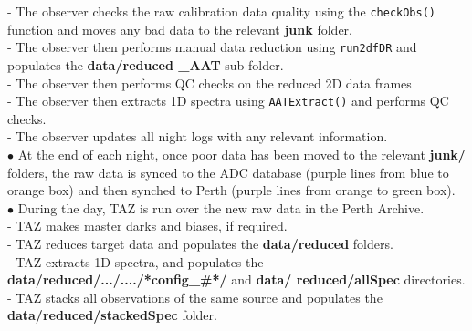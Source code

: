 \documentclass[12pt]{article}
\begin{document}
\hspace{10mm} - The observer checks the raw calibration data quality using the \texttt{checkObs()} function and moves any bad data to the relevant \textbf{junk} folder.\\

\hspace{10mm} - The observer then performs manual data reduction using \texttt{run2dfDR} and populates the \textbf{data/reduced \_AAT} sub-folder. \\

\hspace{10mm} - The observer then performs QC checks on the reduced 2D data frames\\

\hspace{10mm} - The observer then extracts 1D spectra using  \texttt{AATExtract()} and performs QC checks.\\

\hspace{10mm} - The observer updates all night logs with any relevant information.\\

$\bullet$ At the end of each night, once poor data has been moved to the relevant \textbf{junk/} folders, the raw data is synced to the ADC database (purple lines from blue to orange box) and then synched to Perth (purple lines from orange to green box). \\

$\bullet$ During the day, TAZ is run over the new raw data in the Perth Archive. \\

\hspace{10mm} - TAZ makes master darks and biases, if required.\\

\hspace{10mm} - TAZ reduces target data and populates the \textbf{data/reduced} folders. \\

\hspace{10mm} - TAZ extracts 1D spectra, and populates the \textbf{data/reduced/.../..../*config\_\#*/} and \textbf{data/ reduced/allSpec} directories. \\

\hspace{10mm} - TAZ stacks all observations of the same source and populates the \textbf{data/reduced/stackedSpec} folder. \\
\end{document}
